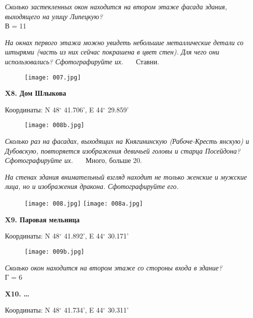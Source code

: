 \documentclass[pscyr]{hedwork}
\begin{document}
  \emph{Сколько застекленных окон находится на втором этаже фасада здания, 
  выходящего на улицу Липецкую?} \\
  В = 11

  \emph{На окнах первого этажа можно увидеть небольшие металлические детали со
  штырями (часть из них сейчас покрашена в цвет стен). Для чего они
  использовались? Сфотографируйте их.} \ \ \ Ставни.
  \begin{figure}[h!]
    \center
    \texttt{[image: 007.jpg]}
  \end{figure}

  \newpage

  \textbf{X8. Дом Шлыкова}

  Координаты: N 48\( ^\circ \) 41.706', E 44\( ^\circ \) 29.859'

  \begin{figure}[h!]
    \center
    \texttt{[image: 008b.jpg]}
  \end{figure}
  
  \emph{Сколько раз на фасадах, выходящих на Княгининскую (Рабоче-Кресть\-%
  янскую) и Дубовскую, повторяется изображения девичьей головы и старца
  Посейдона? Сфотографируйте их.} \ \ \ Много, больше 20.

  \emph{На стенах здания внимательный взгляд находит не только женские и мужские
  лица, но и изображения дракона. Сфотографируйте его.} \\

  \begin{figure}[h!]
    \center
    \texttt{[image: 008.jpg]} \hspace{2em}
    \texttt{[image: 008a.jpg]}
  \end{figure}

  \newpage

  \textbf{X9. Паровая мельница}

  Координаты: N 48\( ^\circ \) 41.892', E 44\( ^\circ \) 30.171'

  \begin{figure}[h!]
    \center
    \texttt{[image: 009b.jpg]}
  \end{figure}

  \emph{Сколько окон находится на втором этаже со стороны входа в здание?} \\
  Г = 6

  \newpage

  \textbf{X10. \ldots}

  Координаты: N 48\( ^\circ \) 41.734', E 44\( ^\circ \) 30.311'
\end{document}
